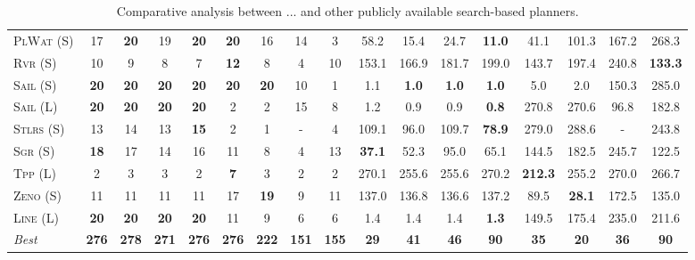 \documentclass[11pt]{article}
\begin{document}
\begin{table}[tb]
{\begin{tabular}{|l||cccccccc||cccccccc||}
\textsc{PlWat} (S)&17&\textbf{20}&19&\textbf{20}&\textbf{20}&16&14&3&58.2&15.4&24.7&\textbf{11.0}&41.1&101.3&167.2&268.3\\
\textsc{Rvr} (S)&10&9&8&7&\textbf{12}&8&4&10&153.1&166.9&181.7&199.0&143.7&197.4&240.8&\textbf{133.3}\\
\textsc{Sail} (S)&\textbf{20}&\textbf{20}&\textbf{20}&\textbf{20}&\textbf{20}&\textbf{20}&10&1&1.1&\textbf{1.0}&\textbf{1.0}&\textbf{1.0}&5.0&2.0&150.3&285.0\\
\textsc{Sail} (L)&\textbf{20}&\textbf{20}&\textbf{20}&\textbf{20}&2&2&15&8&1.2&0.9&0.9&\textbf{0.8}&270.8&270.6&96.8&182.8\\
\textsc{Stlrs} (S)&13&14&13&\textbf{15}&2&1&-&4&109.1&96.0&109.7&\textbf{78.9}&279.0&288.6&-&243.8\\
\textsc{Sgr} (S)&\textbf{18}&17&14&16&11&8&4&13&\textbf{37.1}&52.3&95.0&65.1&144.5&182.5&245.7&122.5\\
\textsc{Tpp} (L)&2&3&3&2&\textbf{7}&3&2&2&270.1&255.6&255.6&270.2&\textbf{212.3}&255.2&270.0&266.7\\
\textsc{Zeno} (S)&11&11&11&11&17&\textbf{19}&9&11&137.0&136.8&136.6&137.2&89.5&\textbf{28.1}&172.5&135.0\\
\textsc{Line} (L)&\textbf{20}&\textbf{20}&\textbf{20}&\textbf{20}&11&9&6&6&1.4&1.4&1.4&\textbf{1.3}&149.5&175.4&235.0&211.6
\\\hline
\textit{Best}&\textbf{276}&\textbf{278}&\textbf{271}&\textbf{276}&\textbf{276}&\textbf{222}&\textbf{151}&\textbf{155}&\textbf{29}&\textbf{41}&\textbf{46}&\textbf{90}&\textbf{35}&\textbf{20}&\textbf{36}&\textbf{90}\\\hline

        \end{tabular}}
        \caption{Comparative analysis between ... and other publicly available search-based planners.}
        \label{tab:search}
        \end{table}
        
\end{document}
